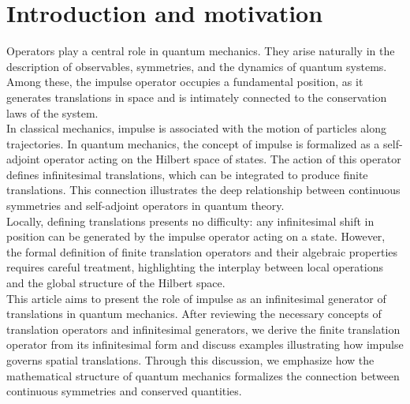 \documentclass{article}
\begin{document}
\section{\textbf{Introduction and motivation}}
\vspace{0.5cm}

Operators play a central role in quantum mechanics. They arise naturally in the description of observables, symmetries, and the dynamics of quantum systems. Among these, the impulse operator occupies a fundamental position, as it generates translations in space and is intimately connected to the conservation laws of the system.\\

In classical mechanics, impulse is associated with the motion of particles along trajectories. In quantum mechanics, the concept of impulse is formalized as a self-adjoint operator acting on the Hilbert space of states. The action of this operator defines infinitesimal translations, which can be integrated to produce finite translations. This connection illustrates the deep relationship between continuous symmetries and self-adjoint operators in quantum theory.\\

Locally, defining translations presents no difficulty: any infinitesimal shift in position can be generated by the impulse operator acting on a state. However, the formal definition of finite translation operators and their algebraic properties requires careful treatment, highlighting the interplay between local operations and the global structure of the Hilbert space.\\

This article aims to present the role of impulse as an infinitesimal generator of translations in quantum mechanics. After reviewing the necessary concepts of translation operators and infinitesimal generators, we derive the finite translation operator from its infinitesimal form and discuss examples illustrating how impulse governs spatial translations. Through this discussion, we emphasize how the mathematical structure of quantum mechanics formalizes the connection between continuous symmetries and conserved quantities.\\

\newpage
\end{document}
